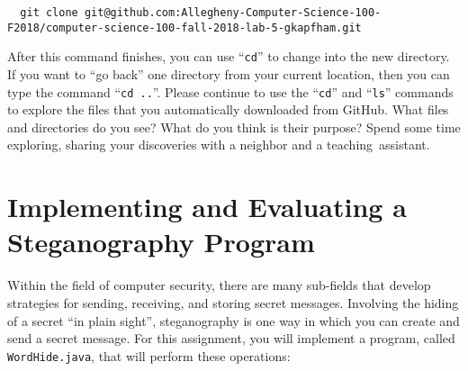 \documentclass[11pt]{article}
\newcommand{\command}[1]{``\lstinline{#1}''}
\newcommand{\step}[1]{``{#1}''}
\begin{document}
\begin{lstlisting}
  git clone git@github.com:Allegheny-Computer-Science-100-F2018/computer-science-100-fall-2018-lab-5-gkapfham.git
\end{lstlisting}

After this command finishes, you can use \command{cd} to change into the new
directory. If you want to \step{go back} one directory from your current
location, then you can type the command \command{cd ..}. Please continue to use
the \command{cd} and \command{ls} commands to explore the files that you
automatically downloaded from GitHub. What files and directories do you see?
What do you think is their purpose? Spend some time exploring, sharing your
discoveries with a neighbor and a \mbox{teaching assistant}.

\section*{Implementing and Evaluating a Steganography Program}

Within the field of computer security, there are many sub-fields that develop
strategies for sending, receiving, and storing secret messages. Involving the
hiding of a secret ``in plain sight'', steganography is one way in which you can
create and send a secret message. For this assignment, you will implement a
program, called {\tt WordHide.java}, that will perform these operations:

\vspace*{-.1in}
\end{document}
